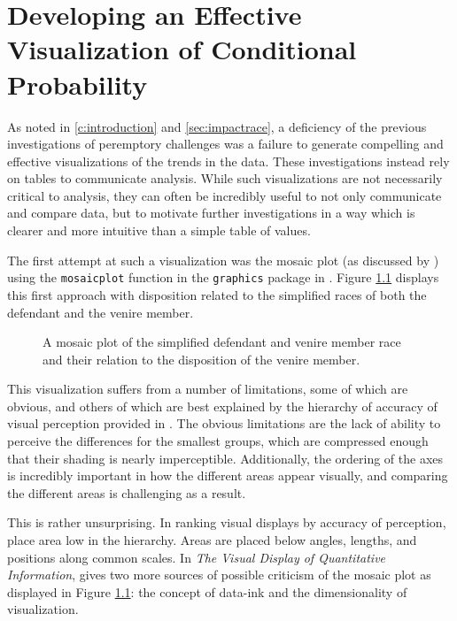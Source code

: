 \chapter{Developing an Effective Visualization of Conditional Probability} \label{app:devmob}

As noted in \ref{c:introduction} and \ref{sec:impactrace}, a
deficiency of the previous investigations of peremptory challenges
was a failure to generate compelling and effective visualizations of
the trends in the data. These investigations instead rely on tables to
communicate analysis. While such visualizations are not necessarily critical to analysis, they can often be incredibly useful to not only
communicate and compare data, but to motivate further investigations in a way which is clearer and more intuitive than
a simple table of values.

The first attempt at such a visualization was the mosaic plot (as discussed by \cite{friendly1994}) using the \texttt{mosaicplot}
function in the \texttt{graphics} package in . Figure \ref{fig:mosaicdefrace} displays this first approach with
disposition related to the simplified races of both the defendant and the venire member.

\begin{figure}[!h]
  \centering
  \caption[Mosaic Plot of Defendant and Venire Member
  Race]{\footnotesize A mosaic plot of the simplified defendant and venire member race and
    their relation to the disposition of the venire member.}
  \label{fig:mosaicdefrace}
\end{figure}

This visualization suffers from a number of limitations, some of which are obvious, and others of which are best explained by
the hierarchy of accuracy of visual perception provided in \cite{cleveland1987}. The obvious limitations are the lack of ability
to perceive the differences for the smallest groups, which are compressed enough that their shading is nearly
imperceptible. Additionally, the ordering of the axes is incredibly important in how the different areas appear visually, and
comparing the different areas is challenging as a result.

This is rather unsurprising. In ranking visual displays by accuracy of perception, \cite{cleveland1987} place area
low in the hierarchy. Areas are placed below angles, lengths, and positions along common scales. In \textit{The Visual Display of
  Quantitative Information}, \citeauthor{VisualDisplayQuant} gives two more sources of possible criticism of the mosaic plot as
displayed in Figure \ref{fig:mosaicdefrace}: the concept of data-ink and the dimensionality of visualization.

